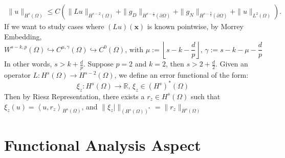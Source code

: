\documentclass[11pt]{article}
\begin{document}
\begin{align*}
\|u\|_{H^s(\Omega)} \leq C\left(\|Lu\|_{H^{s-2}(\Omega)} + \|g_D\|_{H^{s-\frac{1}{2}}(\partial\Omega)} + \|g_N\|_{H^{s-\frac{3}{2}}(\partial\Omega)} + \|u\|_{L^2(\Omega)} \right).
\end{align*}
If we want to study cases where $(Lu)(\bm{x})$ is known pointwise, by Morrey Embedding, 
\begin{equation*}
	W^{s-k,p}(\Omega) \hookrightarrow C^{\mu,\gamma}(\Omega) \hookrightarrow C^{0}(\Omega) \text{, with } \mu := \left \lfloor s-k-\frac{d}{p} \right \rfloor \text{, } \gamma := s-k-\mu-\frac{d}{p}
\end{equation*}
In other words, $s > k + \frac{d}{p}$. Suppose $p=2$ and $k=2$, then $s > 2 + \frac{d}{2}$. Given an operator $L: H^{s}(\Omega) \rightarrow H^{s-2}(\Omega)$, we define an error functional of the form:
\begin{equation*}
	\xi_{z}: H^{s}(\Omega) \rightarrow \mathbb{R} \text{, } \xi_{z} \in \left(H^{s}\right)^*(\Omega)
\end{equation*}
Then by Riesz Representation, there exists a $r_{z} \in H^{s}(\Omega)$ such that $\xi_{z} (u) = \left\langle u , r_{z} \right\rangle_{H^{s}(\Omega)}$, and $\| \xi_{z} |\|_{\left(H^{s}(\Omega)\right)^*} = \| r_{z} \|_{H^{s}(\Omega)}$

\pagebreak

\section{Functional Analysis Aspect}
\end{document}
